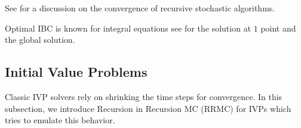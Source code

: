 \documentclass[a4paper,12pt]{article}
\begin{document}
\begin{related}
  See \cite{gupta_convergence_2021} for a discussion on the convergence
  of recursive stochastic algorithms.
\end{related}


\begin{related}
  Optimal IBC is known for integral equations see \cite{heinrich_monte_1998}
  for the solution at $1$ point and the global solution.
\end{related}

\subsection{Initial Value Problems}
Classic IVP solvers rely on shrinking the time steps for
convergence. In this subsection, we introduce
Recursion in Recursion MC (RRMC) for IVPs which tries to emulate
this behavior.
\end{document}
